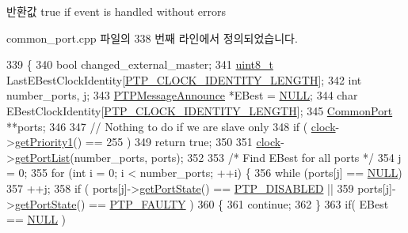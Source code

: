 \begin{DoxyReturn}{반환값}
true if event is handled without errors 
\end{DoxyReturn}


common\+\_\+port.\+cpp 파일의 338 번째 라인에서 정의되었습니다.


\begin{DoxyCode}
339 \{
340     \textcolor{keywordtype}{bool} changed\_external\_master;
341     \hyperlink{stdint_8h_aba7bc1797add20fe3efdf37ced1182c5}{uint8\_t} LastEBestClockIdentity[\hyperlink{ptptypes_8hpp_afd1566058ed7927c2b790c9d4a0051ec}{PTP\_CLOCK\_IDENTITY\_LENGTH}];
342     \textcolor{keywordtype}{int} number\_ports, j;
343     \hyperlink{class_p_t_p_message_announce}{PTPMessageAnnounce} *EBest = \hyperlink{openavb__types__base__pub_8h_a070d2ce7b6bb7e5c05602aa8c308d0c4}{NULL};
344     \textcolor{keywordtype}{char} EBestClockIdentity[\hyperlink{ptptypes_8hpp_afd1566058ed7927c2b790c9d4a0051ec}{PTP\_CLOCK\_IDENTITY\_LENGTH}];
345     \hyperlink{class_common_port}{CommonPort} **ports;
346 
347     \textcolor{comment}{// Nothing to do if we are slave only}
348     \textcolor{keywordflow}{if} ( \hyperlink{class_common_port_aa2bc8731fa5aeb5b033feebc2b67258c}{clock}->\hyperlink{class_i_e_e_e1588_clock_a3577d05b0d34d976c23354585d7516ad}{getPriority1}() == 255 )
349         \textcolor{keywordflow}{return} \textcolor{keyword}{true};
350 
351     \hyperlink{class_common_port_aa2bc8731fa5aeb5b033feebc2b67258c}{clock}->\hyperlink{class_i_e_e_e1588_clock_a92094c4bd83a368921aef482e115f7df}{getPortList}(number\_ports, ports);
352 
353     \textcolor{comment}{/* Find EBest for all ports */}
354     j = 0;
355     \textcolor{keywordflow}{for} (\textcolor{keywordtype}{int} i = 0; i < number\_ports; ++i) \{
356         \textcolor{keywordflow}{while} (ports[j] == \hyperlink{openavb__types__base__pub_8h_a070d2ce7b6bb7e5c05602aa8c308d0c4}{NULL})
357             ++j;
358         \textcolor{keywordflow}{if} ( ports[j]->\hyperlink{class_common_port_aa4182d914fdb9a27fb875d8495e0289c}{getPortState}() == \hyperlink{ptptypes_8hpp_a679431f1afc75d7bb9e972c022e53672a38f3a091adeb361140c66f2f6dc44df7}{PTP\_DISABLED} ||
359              ports[j]->\hyperlink{class_common_port_aa4182d914fdb9a27fb875d8495e0289c}{getPortState}() == \hyperlink{ptptypes_8hpp_a679431f1afc75d7bb9e972c022e53672ac2e47460540ecdcec420be97a0bb9ff2}{PTP\_FAULTY} )
360         \{
361             \textcolor{keywordflow}{continue};
362         \}
363         \textcolor{keywordflow}{if}( EBest == \hyperlink{openavb__types__base__pub_8h_a070d2ce7b6bb7e5c05602aa8c308d0c4}{NULL} )

\end{DoxyCode}
